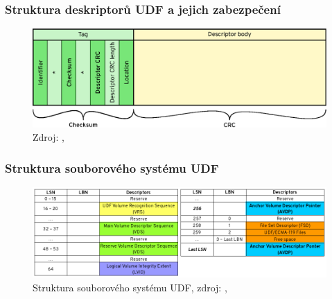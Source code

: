 \documentclass[aspectratio=169]{beamer}
\begin{document}
        \begin{frame}
            \frametitle{Struktura deskriptorů UDF a jejich zabezpečení}
			\vspace{40 pt}
			\center
            \begin{figure}
			    \includegraphics[width=14.5cm]{det-ch.eps}
                \caption{\Large{Zdroj: \cite{udf}, \cite{ecma}}}
            \end{figure}
        \end{frame}
		\begin{frame}
			\frametitle{Struktura souborového systému UDF}
			\vspace{40 pt}
			\center
            \begin{figure}
			    \includegraphics[width=14cm]{strukutra.png}
                \caption{\Large{Struktura souborového systému UDF, zdroj: \cite{udf}, \cite{ecma}}}
            \end{figure}
		\end{frame}
	
\end{document}
